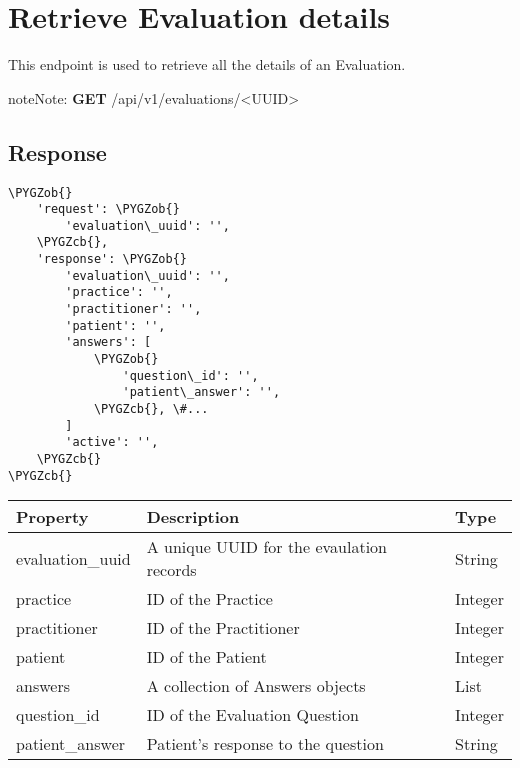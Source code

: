 \documentclass[letterpaper,10pt,english]{sphinxmanual}
\def\PYGZob{\char`\{}
\def\PYGZcb{\char`\}}
\begin{document}
\section{Retrieve Evaluation details}
\label{dev-api-evaluations:retrieve-evaluation-details}
This endpoint is used to retrieve all the details of an Evaluation.

\begin{notice}{note}{Note:}
\textbf{GET} /api/v1/evaluations/\textless{}UUID\textgreater{}
\end{notice}


\subsection{Response}
\label{dev-api-evaluations:id1}
\begin{Verbatim}[commandchars=\\\{\}]
\PYGZob{}
    'request': \PYGZob{}
        'evaluation\_uuid': '',
    \PYGZcb{},
    'response': \PYGZob{}
        'evaluation\_uuid': '',
        'practice': '',
        'practitioner': '',
        'patient': '',
        'answers': [
            \PYGZob{}
                'question\_id': '',
                'patient\_answer': '',
            \PYGZcb{}, \#...
        ]
        'active': '',
    \PYGZcb{}
\PYGZcb{}
\end{Verbatim}

\begin{tabulary}{\linewidth}{|L|L|L|}
\hline
\textsf{\relax 
Property
} & \textsf{\relax 
Description
} & \textsf{\relax 
Type
}\\
\hline
evaluation\_uuid
 & 
A unique UUID for the evaulation
records
 & 
String
\\

practice
 & 
ID of the Practice
 & 
Integer
\\

practitioner
 & 
ID of the Practitioner
 & 
Integer
\\

patient
 & 
ID of the Patient
 & 
Integer
\\

answers
 & 
A collection of Answers objects
 & 
List
\\

question\_id
 & 
ID of the Evaluation Question
 & 
Integer
\\

patient\_answer
 & 
Patient's response to the question
 & 
String
\\
\hline\end{tabulary}
\end{document}
